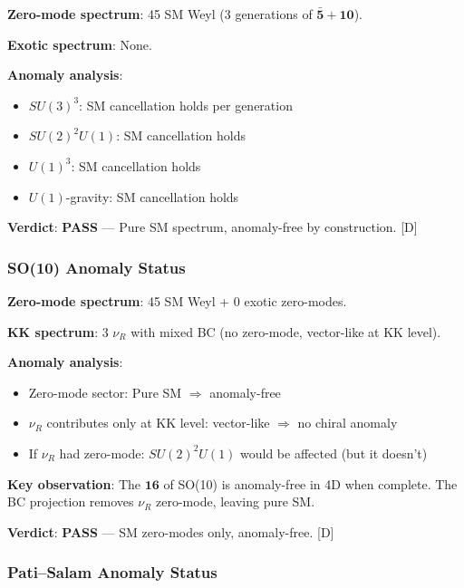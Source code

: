 \documentclass[11pt,a4paper]{article}
\newcommand{\tagD}{\textcolor{blue!70!black}{[D]}}
\begin{document}
\begin{auditbox}
\textbf{Zero-mode spectrum}: 45 SM Weyl (3 generations of $\bar{\mathbf{5}} + \mathbf{10}$).

\textbf{Exotic spectrum}: None.

\textbf{Anomaly analysis}:
\begin{itemize}
    \item $SU(3)^3$: SM cancellation holds per generation
    \item $SU(2)^2 U(1)$: SM cancellation holds
    \item $U(1)^3$: SM cancellation holds
    \item $U(1)$-gravity: SM cancellation holds
\end{itemize}

\textbf{Verdict}: \textcolor{green!60!black}{\textbf{PASS}} --- Pure SM spectrum, anomaly-free by construction.
\tagD
\end{auditbox}

\subsubsection{SO(10) Anomaly Status}

\begin{auditbox}
\textbf{Zero-mode spectrum}: 45 SM Weyl + 0 exotic zero-modes.

\textbf{KK spectrum}: 3 $\nu_R$ with mixed BC (no zero-mode, vector-like at KK level).

\textbf{Anomaly analysis}:
\begin{itemize}
    \item Zero-mode sector: Pure SM $\Rightarrow$ anomaly-free
    \item $\nu_R$ contributes only at KK level: vector-like $\Rightarrow$ no chiral anomaly
    \item If $\nu_R$ had zero-mode: $SU(2)^2 U(1)$ would be affected (but it doesn't)
\end{itemize}

\textbf{Key observation}: The $\mathbf{16}$ of SO(10) is anomaly-free in 4D when complete.
The BC projection removes $\nu_R$ zero-mode, leaving pure SM.

\textbf{Verdict}: \textcolor{green!60!black}{\textbf{PASS}} --- SM zero-modes only, anomaly-free.
\tagD
\end{auditbox}

\subsubsection{Pati--Salam Anomaly Status}
\end{document}
